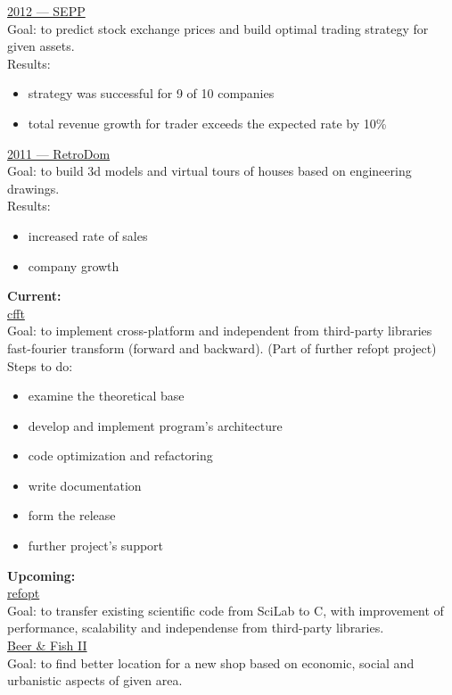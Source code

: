 \documentclass[a4paper,12pt,fullpage]{article}
\begin{document}
\underline{2012 --- SEPP}\\
Goal: to predict stock exchange prices and build optimal trading strategy for given assets.\\
Results: 
\begin{itemize}
	\item strategy was successful for 9 of 10 companies
	\item total revenue growth for trader exceeds the expected rate by 10\%\\
\end{itemize}


\underline{2011 --- RetroDom}\\
Goal: to build 3d models and virtual tours of houses based on engineering drawings.\\
Results: 
\begin{itemize}
	\item increased rate of sales
	\item company growth\\
\end{itemize}

\textbf{Current:}\\
\underline{cfft}\\
Goal: to implement cross-platform and independent from third-party libraries fast-fourier transform (forward and backward). (Part of further refopt project)\\
Steps to do:
\begin{itemize}
	\item examine the theoretical base
	\item develop and implement program's architecture
	\item code optimization and refactoring
	\item write documentation
	\item form the release
	\item further project's support\\
\end{itemize}


\textbf{Upcoming:}\\
\underline{refopt}\\
Goal: to transfer existing scientific code from SciLab to C, with improvement of performance, scalability and independense from third-party libraries.\\

\underline{Beer \& Fish II}\\
Goal: to find better location for a new shop based on economic, social and urbanistic aspects of given area.\\
\end{document}
